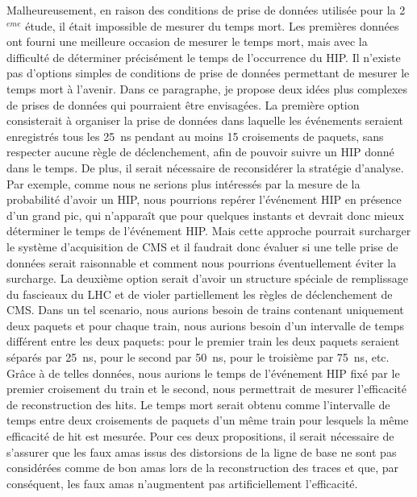 Malheureusement, en raison des conditions de prise de données utilisée pour la 2$^{eme}$ étude, il était impossible de mesurer du temps mort. Les premières données ont fourni une meilleure occasion de mesurer le temps mort, mais avec la difficulté de déterminer précisément le temps de l'occurrence du HIP. Il n’existe pas d’options simples de conditions de prise de données permettant de mesurer le temps mort à l’avenir. Dans ce paragraphe, je propose deux idées plus complexes de prises de données qui pourraient être envisagées. La première option consisterait à organiser la prise de données dans laquelle les événements seraient enregistrés tous les 25~ns pendant au moins 15 croisements de paquets, sans respecter aucune règle de déclenchement, afin de pouvoir suivre un HIP donné dans le temps. De plus, il serait nécessaire de reconsidérer la stratégie d’analyse. Par exemple, comme nous ne serions plus intéressés par la mesure de la probabilité d'avoir un HIP, nous pourrions repérer l’événement HIP en présence d’un grand pic, qui n’apparaît que pour quelques instants et devrait donc mieux déterminer le temps de l’événement HIP. Mais cette approche pourrait surcharger le système d'acquisition de CMS et il faudrait donc évaluer si une telle prise de données serait raisonnable et comment nous pourrions éventuellement éviter la surcharge. La deuxième option serait d'avoir un structure spéciale de remplissage du fascieaux du LHC et de violer partiellement les règles de déclenchement de CMS. Dans un tel scenario, nous aurions besoin de trains contenant uniquement deux paquets et pour chaque train, nous aurions besoin d'un intervalle de temps différent entre les deux paquets: pour le premier train les deux paquets seraient séparés par 25~ns, pour le second par 50~ns, pour le troisième par 75~ns, etc. Grâce à de telles données, nous aurions le temps de l'événement HIP fixé par le premier croisement du train et le second, nous permettrait de mesurer l'efficacité de reconstruction des hits. Le temps mort serait obtenu  comme l'intervalle de temps entre deux croisements de paquets d'un  même train pour lesquels la même efficacité de hit est mesurée. Pour ces deux propositions, il serait nécessaire de s'assurer que les faux amas issus des distorsions de la ligne de base ne sont pas considérées comme de bon amas lors de la reconstruction  des traces et que, par conséquent, les faux amas n'augmentent pas artificiellement l'efficacité.

